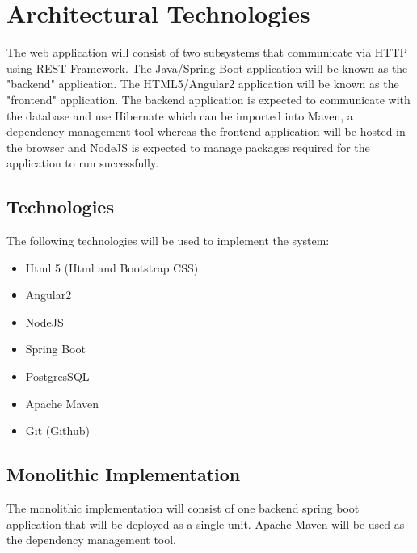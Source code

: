 \documentclass[12pt]{article}
\begin{document}
\section{Architectural Technologies}
The web application will consist of two subsystems that communicate via HTTP using REST Framework. The
Java/Spring Boot application will be known as the "backend" application. The HTML5/Angular2 application
will be known as the "frontend" application. The backend application is expected to communicate with the
database and use Hibernate which can be imported into Maven, a dependency management tool whereas the
frontend application will be hosted in the browser and NodeJS is expected to manage packages required for the
application to run successfully.

\subsection{Technologies}
The following technologies will be used to implement the system:
\begin{itemize}
\item Html 5 (Html and Bootstrap CSS)
\item Angular2
\item NodeJS
\item Spring Boot
\item PostgresSQL
\item Apache Maven
\item Git (Github)
\end{itemize}

\subsection{Monolithic Implementation}
The monolithic implementation will consist of one backend spring boot\\ application that will be deployed as a
single unit. Apache Maven will be used as the dependency management tool.
\end{document}
